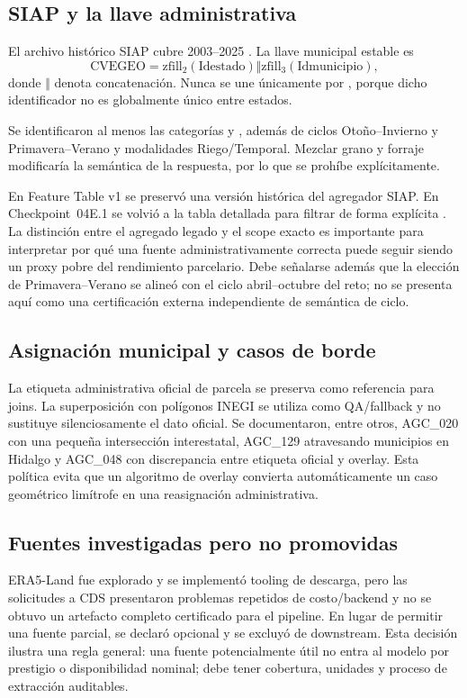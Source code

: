 \subsection{SIAP y la llave administrativa}

El archivo histórico SIAP cubre 2003--2025 \citep{SIAPDatos}. La llave municipal estable es
\begin{equation}
\mathrm{CVEGEO}
=
\mathrm{zfill}_2(\mathrm{Idestado})
\Vert
\mathrm{zfill}_3(\mathrm{Idmunicipio}),
\label{eq:cvegeo}
\end{equation}
donde $\Vert$ denota concatenación. Nunca se une únicamente por
, porque dicho identificador no es globalmente único entre estados.

Se identificaron al menos las categorías  y
, además de ciclos Otoño--Invierno y
Primavera--Verano y modalidades Riego/Temporal. Mezclar grano y forraje modificaría la
semántica de la respuesta, por lo que se prohíbe explícitamente.

En Feature Table v1 se preservó una versión histórica del agregador SIAP. En
Checkpoint~04E.1 se volvió a la tabla detallada para filtrar de forma explícita
.
La distinción entre el agregado legado y el scope exacto es importante para interpretar por
qué una fuente administrativamente correcta puede seguir siendo un proxy pobre del rendimiento
parcelario. Debe señalarse además que la elección de Primavera--Verano se alineó con el ciclo
abril--octubre del reto; no se presenta aquí como una certificación externa independiente de
semántica de ciclo.

\subsection{Asignación municipal y casos de borde}

La etiqueta administrativa oficial de parcela se preserva como referencia para joins. La
superposición con polígonos INEGI se utiliza como QA/fallback y no sustituye silenciosamente
el dato oficial. Se documentaron, entre otros, AGC\_020 con una pequeña intersección
interestatal, AGC\_129 atravesando municipios en Hidalgo y AGC\_048 con discrepancia entre
etiqueta oficial y overlay. Esta política evita que un algoritmo de overlay convierta
automáticamente un caso geométrico limítrofe en una reasignación administrativa.

\subsection{Fuentes investigadas pero no promovidas}

ERA5-Land fue explorado y se implementó tooling de descarga, pero las solicitudes a CDS
presentaron problemas repetidos de costo/backend y no se obtuvo un artefacto completo
certificado para el pipeline. En lugar de permitir una fuente parcial, se declaró opcional y
se excluyó de downstream. Esta decisión ilustra una regla general: una fuente potencialmente
útil no entra al modelo por prestigio o disponibilidad nominal; debe tener cobertura,
unidades y proceso de extracción auditables.

